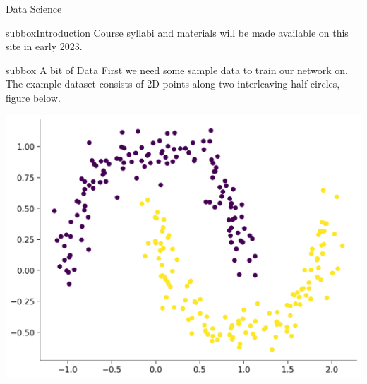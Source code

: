 
\begin{multicols}{3}
\begin{textbox}{Data Science}
\begin{subbox}{subbox}{Introduction }
\scriptsize
Course syllabi and materials will be made available on this site in early 2023.
\end{subbox}

\begin{subbox}{subbox}{ A bit of Data }
\scriptsize
First we need some sample data to train our network on. The example dataset consists of 2D points along two interleaving half circles, figure below. 

\centering
\includegraphics[scale=0.3]{Figures/NN/NNFigure1.png}


\end{subbox}

\end{textbox}
\end{multicols}